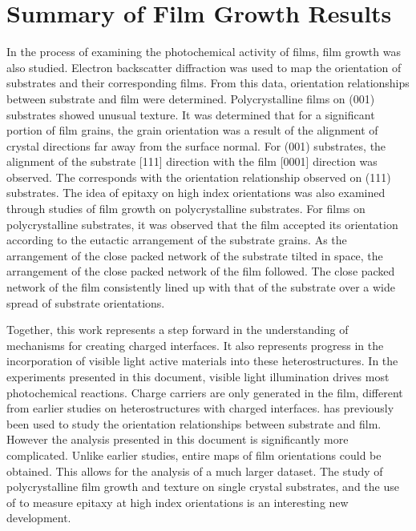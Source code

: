 \section{Summary of Film Growth Results}
\label{sec:conclusions.growth.summary}


In the process of examining the photochemical activity of  films,  film growth was also studied. Electron backscatter diffraction was used to map the orientation of substrates and their corresponding films. From this data, orientation relationships between substrate and film were determined. Polycrystalline films on (001) substrates showed unusual texture. It was determined that for a significant portion of film grains, the grain orientation was a result of the alignment of crystal directions far away from the surface normal. For (001) substrates, the alignment of the substrate [111] direction with the film [0001] direction was observed. The corresponds with the orientation relationship observed on (111) substrates. The idea of epitaxy on high index orientations was also examined through  studies of film growth on polycrystalline substrates. For films on polycrystalline substrates, it was observed that the film accepted its orientation according to the eutactic arrangement of the substrate grains. As the arrangement of the close packed network of the substrate tilted in space, the arrangement of the close packed network of the film followed. The close packed network of the film consistently lined up with that of the substrate over a wide spread of substrate orientations.

Together, this work represents a step forward in the understanding of mechanisms for creating charged interfaces. It also represents progress in the incorporation of visible light active materials into these heterostructures. In the experiments presented in this document, visible light illumination drives most photochemical reactions. Charge carriers are only generated in the film, different from earlier studies on heterostructures with charged interfaces.  has previously been used to study the orientation relationships between substrate and film. However the analysis presented in this document is significantly more complicated. Unlike earlier studies, entire maps of film orientations could be obtained. This allows for the analysis of a much larger dataset. The study of polycrystalline film growth and texture on single crystal substrates, and the use of  to measure epitaxy at high index orientations is an interesting new development.

